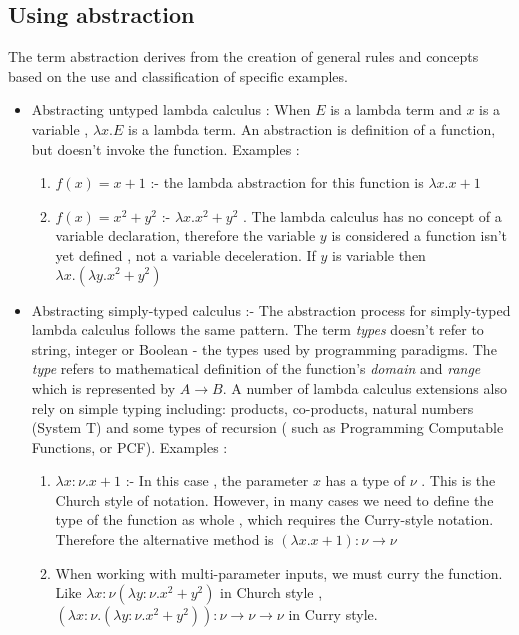 \subsection{Using abstraction}
The term abstraction derives from the creation of general rules and concepts based on the use and classification of specific examples.
\begin{itemize}
\item Abstracting untyped lambda calculus : When $E$ is a lambda term and $x$ is a variable , $\lambda x.E$ is a lambda term. An abstraction is definition of a function, but doesn't invoke the function. Examples :
\begin{enumerate}
\item $f(x) = x + 1 $ :- the lambda abstraction for this function is $\lambda x . x+ 1$
\item $f(x) = x^2 + y^2 $ :- $\lambda x .x^2 + y^2$ . The lambda calculus has no concept of a variable declaration, therefore the variable $y$ is considered a function isn't yet defined , not a variable deceleration. If $y$ is variable then $\lambda x.(\lambda y. x^2 + y^2)$
\end{enumerate}
\item Abstracting simply-typed calculus :- The abstraction process for simply-typed lambda calculus follows the same pattern. The term \emph{types} doesn't refer to string, integer or Boolean - the types used by programming paradigms. The \emph{type} refers to mathematical definition of the function's \emph{domain} and \emph{range} which is represented by $ A \rightarrow B $. A number of lambda calculus extensions also rely on simple typing including: products, co-products, natural numbers (System T) and some types of recursion ( such as Programming Computable Functions, or PCF). Examples :
\begin{enumerate}
\item $\lambda x :\nu .x + 1$ :- In this case , the parameter $x$ has a type of $\nu$ . This is the Church style of notation. However, in many cases we need to define the type of the function as whole , which requires the Curry-style notation. Therefore the alternative method is $(\lambda x.x + 1):\nu \rightarrow \nu$
\item When working with multi-parameter inputs, we must curry the function. Like $\lambda x:\nu (\lambda y :\nu . x^2 + y^2 )$ in Church style ,\\ 
$(\lambda x :\nu .(\lambda y :\nu .x ^2 + y^2)) :\nu \rightarrow \nu \rightarrow \nu $ in Curry style.
\end{enumerate}
\end{itemize}
